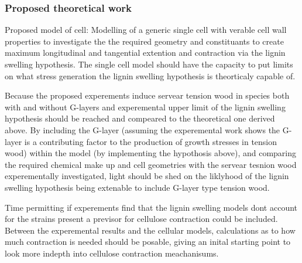 \documentclass{article}
\begin{document}
\subsubsection{Proposed theoretical work}
%
%
%
%
%
%
%
%
%
%
%


Proposed model of cell:
Modelling of a generic single cell with verable cell wall properties to
investigate the the required geometry and constituants to create maximum
longitudinal and tangential extention and contraction via the lignin swelling
hypothesis. The single cell model should have the capacity to put limits on what
stress generation the lignin swelling hypothesis is theorticaly capable of.

Because the proposed experements induce servear tension wood in species both
with and without G-layers and experemental upper limit of the lignin swelling
hypothesis should be reached and compeared to the theoretical one derived above.
By including the G-layer (assuming the experemental work shows the G-layer is a
contributing factor to the production of growth stresses in tension wood) within
the model (by implementing the hypothosis above), and comparing the required
chemical make up and cell geometries with the servear tesnion wood
experementally investigated, light should be shed on the liklyhood of the lignin
swelling hypothesis being extenable to include G-layer type tension wood.

Time permitting if experements find that the lignin swelling models dont account
for the strains present a previsor for cellulose contraction could be included.
Between the experemental results and the cellular models, calculations as to how
much contraction is needed should be posable, giving an inital starting point to
look more indepth into cellulose contraction meachanisums.
\end{document}
